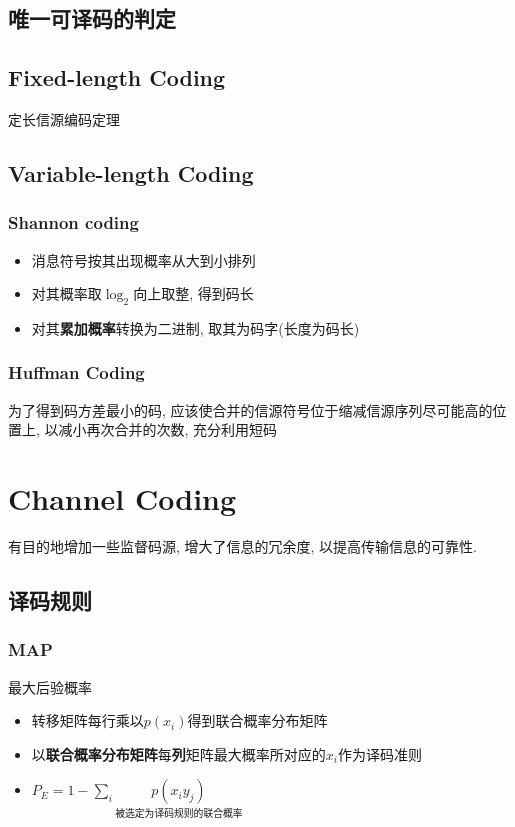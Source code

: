\documentclass[a4paper]{report}
\begin{document}
\section{唯一可译码的判定}
\section{Fixed-length Coding}
定长信源编码定理
\section{Variable-length Coding}
\subsection{Shannon coding}
\begin{itemize}
  \item 消息符号按其出现概率从大到小排列
  \item 对其概率取$\log_2$向上取整, 得到码长
  \item 对其\textbf{累加概率}转换为二进制, 取其为码字(长度为码长)
\end{itemize}
\subsection{Huffman Coding}
为了得到码方差最小的码, 应该使合并的信源符号位于缩减信源序列尽可能高的位置上, 以减小再次合并的次数, 充分利用短码



\chapter{Channel Coding}
有目的地增加一些监督码源, 增大了信息的冗余度, 以提高传输信息的可靠性. 
\section{译码规则}
\subsection{MAP}
最大后验概率
\begin{itemize}
  \item 转移矩阵每行乘以$p(x_i)$得到联合概率分布矩阵
  \item 以\textbf{联合概率分布矩阵}每\textbf{列}矩阵最大概率所对应的$x_i$作为译码准则
  \item $P_E=1-\displaystyle\sum_{i} \underset{\text{被选定为译码规则的联合概率}}{p(x_i y_j)}$
\end{itemize}
\end{document}
